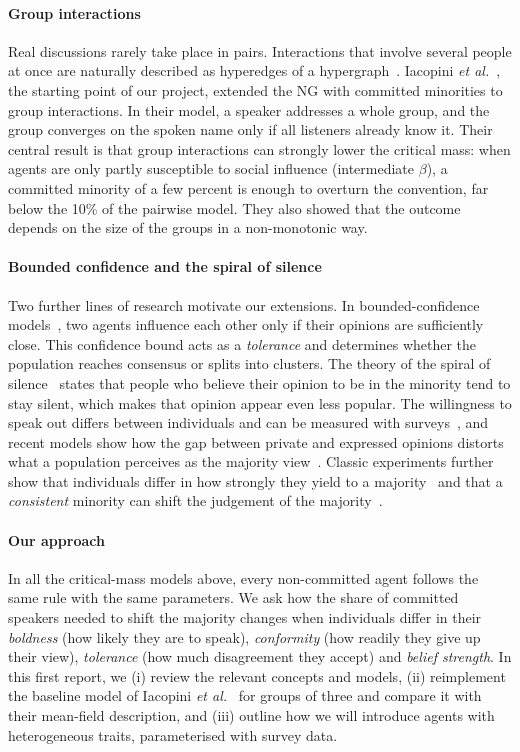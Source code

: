 \documentclass[9pt,twoside]{pnas-new}
\begin{document}
\paragraph*{Group interactions}
Real discussions rarely take place in pairs. Interactions that involve several
people at once are naturally described as hyperedges of a
hypergraph~\cite{battiston2020networks}. Iacopini
\emph{et al.}~\cite{iacopini2022group}, the starting point of our project,
extended the NG with committed minorities to group interactions. In their
model, a speaker addresses a whole group, and the group converges on the
spoken name only if all listeners already know it. Their central result is
that group interactions can strongly lower the critical mass: when agents are
only partly susceptible to social influence (intermediate $\beta$), a committed
minority of a few percent is enough to overturn the convention, far below the
10\% of the pairwise model. They also showed that the outcome depends on the
size of the groups in a non-monotonic way.

\paragraph*{Bounded confidence and the spiral of silence}
Two further lines of research motivate our extensions. In bounded-confidence
models~\cite{deffuant2000mixing,hegselmann2002opinion}, two agents influence
each other only if their opinions are sufficiently close. This confidence bound
acts as a \emph{tolerance} and determines whether the population reaches
consensus or splits into clusters. The theory of the spiral of
silence~\cite{noelleneumann1974spiral} states that people who believe their
opinion to be in the minority tend to stay silent, which makes that opinion
appear even less popular. The willingness to speak out differs between
individuals and can be measured with surveys~\cite{hayes2005willingness}, and
recent models show how the gap between private and expressed opinions distorts
what a population perceives as the majority
view~\cite{gaisbauer2020dynamics,vilone2023modelling}. Classic experiments
further show that individuals differ in how strongly they yield to a
majority~\cite{asch1956studies} and that a \emph{consistent} minority can shift
the judgement of the majority~\cite{moscovici1969influence}.

\paragraph*{Our approach}
In all the critical-mass models above, every non-committed agent follows the
same rule with the same parameters. We ask how the share of committed speakers
needed to shift the majority changes when individuals differ in their
\emph{boldness} (how likely they are to speak), \emph{conformity} (how readily
they give up their view), \emph{tolerance} (how much disagreement they accept)
and \emph{belief strength}. In this first report, we (i) review the relevant
concepts and models, (ii) reimplement the baseline model of Iacopini
\emph{et al.}~\cite{iacopini2022group} for groups of three and compare it with
their mean-field description, and (iii) outline how we will introduce agents
with heterogeneous traits, parameterised with survey data.
\end{document}
